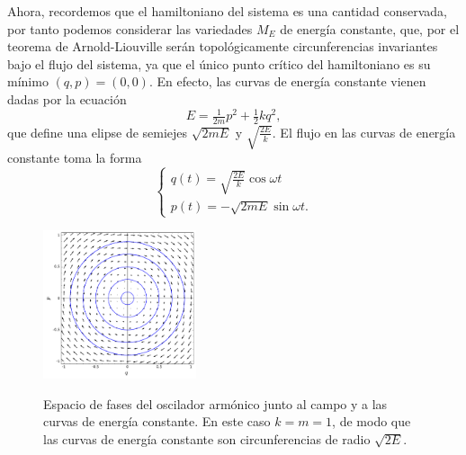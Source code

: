   Ahora, recordemos que el hamiltoniano del sistema es una cantidad conservada, por tanto podemos considerar las variedades $M_E$ de energía constante, que, por el teorema de Arnold-Liouville serán topológicamente circunferencias invariantes bajo el flujo del sistema, ya que el único punto crítico del hamiltoniano es su mínimo $(q,p)=(0,0)$. En efecto, las curvas de energía constante vienen dadas por la ecuación
  \begin{equation*}
    E=\tfrac{1}{2m}p^2+\tfrac{1}{2}kq^2,
  \end{equation*}
  que define una elipse de semiejes $\sqrt{2mE}$ y $\sqrt{\frac{2E}{k}}$. El flujo en las curvas de energía constante toma la forma
  \begin{equation*}
    \begin{cases}
      q(t)=\sqrt{\frac{2E}{k}}\cos\omega t \\ 
      p(t)=-\sqrt{2mE}\sin\omega t.
 \end{cases}
  \end{equation*}
  
  \begin{figure}[h]
    \centering
    \includegraphics[width=0.4\textwidth]{pics/oscilador}
    \label{fig:oscilador}
    \caption{\small Espacio de fases del oscilador armónico junto al campo y a las curvas de energía constante. En este caso $k=m=1$, de modo que las curvas de energía constante son circunferencias de radio $\sqrt{2E}$.}
  \end{figure}

